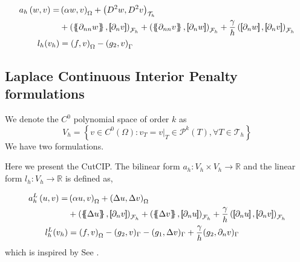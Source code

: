 \begin{equation*}
\begin{split}
a_{h} \left( w, v \right)   =&
    \left( \alpha  w, v \right) _{\Omega }   +  \left( D^2 w, D^2v \right) _{\mathcal{T} _{h}} \\
 & +
  \left( \mean{  \partial _{n n} w }, \jump{ \partial _{n }v} \right)_{\mathcal{F}_{h}}  +
 \left( \mean{ \partial _{n n} v }, \jump{ \partial _{n}w }      \right)_{\mathcal{F}_{h}}  + \frac{\gamma }{h}  \left( \jump{ \partial _{n} w}, \jump{ \partial _{n} v   }   \right)_{\mathcal{F}_{h}} \\
 l_{h}( v_{h}) & =  \left( f, v \right) _{\Omega }  - \left(g_{2}, v  \right) _{\Gamma }
\end{split}
\end{equation*}

\subsection{ Laplace Continuous Interior Penalty formulations }%
\label{sub:cip_formulations}



We denote the $C^{0}$ polynomial space of order $k$ as
\[
V_{h} = \left\{ v \in C^{0}\left( \Omega  \right): v_{T} = v | _{T} \in \mathcal{P} ^{k}\left( T \right), \forall T \in
\mathcal{T}_{h}    \right\}
\]
We have two formulations.

Here we present the CutCIP. The bilinear form $a_{h}:  V_{h}\times  V_{h} \to \mathbb{R} $ and the linear form $l_{h}: V_{h} \to \mathbb{R} $  is defined as,

\begin{equation*}
\begin{split}
a_{h}^{L} \left( u, v \right)   =&
    \left( \alpha  u, v \right) _{\Omega }   +  \left( \Delta  u, \Delta v \right) _{ \Omega } \\
 & + \left( \mean{  \Delta  u }, \jump{ \partial _{n }v} \right)_{\mathcal{F}_{h}  }  + \left( \mean{ \Delta  v }, \jump{ \partial _{n}u }      \right)_{\mathcal{F}_{h}  }  + \frac{\gamma }{h}  \left( \jump{ \partial _{n} u}, \jump{ \partial _{n} v   }   \right)_{\mathcal{F}_{h} } \\
 l^{L}_{h}( v_{h}) & =  \left( f, v \right) _{\Omega } - ( g_{2},  v )_{\Gamma } -  ( g_{1}, \Delta  v  )_{\Gamma }  + \frac{\gamma }{h} ( g_{2}, \partial _{n} v  )_{\Gamma }
\end{split}
\end{equation*}
which is inspired by See \cite[Equation 3.4]{feng2007fully}.

